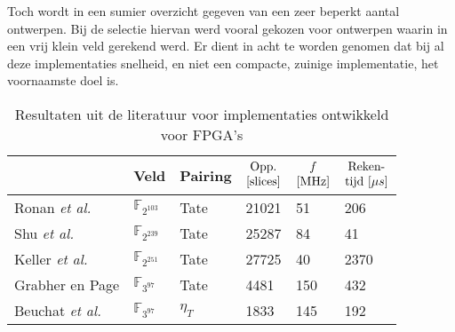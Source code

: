 Toch wordt in  een sumier overzicht gegeven van een zeer beperkt aantal ontwerpen. Bij de selectie hiervan werd vooral gekozen voor ontwerpen waarin in een vrij klein veld gerekend werd. Er dient in acht te worden genomen dat bij al deze implementaties snelheid, en niet een compacte, zuinige implementatie, het voornaamste doel is. 

\begin{table}[h]
	\caption{Resultaten uit de literatuur voor implementaties ontwikkeld voor FPGA's}
	\label{tabel-resultaten-fpga}

	\centering
	\begin{tabular}{llllll}
		\toprule
		&	\multicolumn{1}{c}{Veld}	& \multicolumn{1}{c}{Pairing}	& $\begin{array}{@{}c@{}}\text{Opp.}\\\text{[slices]}\end{array}$	& $\begin{array}{@{}c@{}}f\\\text{[MHz]}\end{array}$	& $\begin{array}{@{}c@{}}\text{Reken-}\\\text{tijd }[\mu s]\end{array}$\\
		\midrule
		Ronan \emph{et al.} \cite{ronan}				& $\mathbb{F}_{2^{103}}$	& Tate		& 21021	& 51	& 206\\
		Shu \emph{et al.} \cite{shu}					& $\mathbb{F}_{2^{239}}$	& Tate		& 25287	& 84	& 41\\
		Keller \emph{et al.} \cite{keller}			& $\mathbb{F}_{2^{251}}$	& Tate		& 27725	& 40	& 2370\\
		Grabher en Page \cite{grabher}				& $\mathbb{F}_{3^{97}}$		& Tate		& 4481	& 150	& 432\\
		Beuchat \emph{et al.} \cite{beuchat-eta}	& $\mathbb{F}_{3^{97}}$		& $\eta_T$	& 1833	& 145	& 192\\
		\bottomrule
	\end{tabular}
\end{table}

